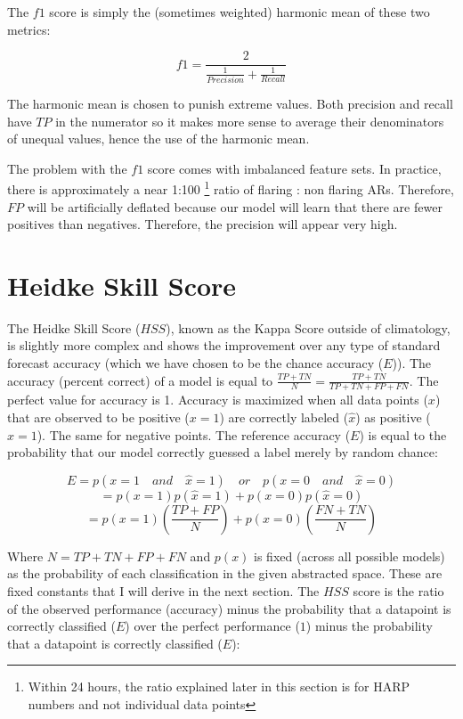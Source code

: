 \documentclass[defaultstyle,11pt]{thesis}
\begin{document}
The $f1$ score is simply the (sometimes weighted) harmonic mean of these two metrics:

$$f1 = \frac{2}{\frac{1}{Precision} + \frac{1}{Recall}}$$

The harmonic mean is chosen to punish extreme values. Both precision and recall have $TP$ in the numerator so it makes more sense to average their denominators of unequal values, hence the use of the harmonic mean.

The problem with the $f1$ score comes with imbalanced feature sets. In practice, there is approximately a near 1:100 \footnote{Within 24 hours, the ratio explained later in this section is for HARP numbers and not individual data points} ratio of flaring : non flaring ARs. Therefore, $FP$ will be artificially deflated because our model will learn that there are fewer positives than negatives. Therefore, the precision will appear very high. 

\section{Heidke Skill Score}
The Heidke Skill Score ($HSS$), known as the Kappa Score outside of climatology, is slightly more complex and shows the improvement over any type of standard forecast accuracy (which we have chosen to be the chance accuracy ($E$)). The accuracy (percent correct) of a model is equal to $\frac{TP + TN}{N} = \frac{TP + TN}{TP + TN + FP + FN}$. The perfect value for accuracy is 1. Accuracy is maximized when all data points ($x$) that are observed to be positive ($x = 1$) are correctly labeled ($\hat{x}$) as positive ($\hat{x} = 1$). The same for negative points. The reference accuracy ($E$) is equal to the probability that our model correctly guessed a label merely by random chance:

$$E = p(x = 1 \quad and \quad \hat{x} = 1) \quad or \quad p(x = 0 \quad and \quad \hat{x} = 0)$$
$$= p(x = 1)p(\hat{x} = 1) + p(x = 0)p(\hat{x} = 0)$$
$$ = p(x = 1)(\frac{TP + FP}{N}) + p(x = 0)(\frac{FN + TN}{N})$$

Where $N = TP + TN + FP + FN$ and $p(x)$ is fixed (across all possible models) as the probability of each classification in the given abstracted space. These are fixed constants that I will derive in the next section. The $HSS$ score is the ratio of the observed performance (accuracy) minus the probability that a datapoint is correctly classified ($E$) over the perfect performance ($1$) minus the probability that a datapoint is correctly classified ($E$):
\end{document}
